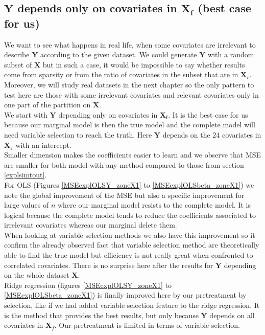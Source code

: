 \documentclass[12pt,a4paper]{report}
\begin{document}
\clearpage
\newpage
\subsection{$\boldsymbol{Y}$ depends only on covariates in $\boldsymbol{X_{f}}$ (best case for us)}	 \label{tableMSEsimdroite}
\FloatBarrier
 We want to see what happens in real life, when some covariates are irrelevant to describe $\boldsymbol{Y}$ according to the given dataset. We could generate $\boldsymbol{Y}$ with a random subset of $\boldsymbol{X}$ but in such a case, it would be impossible to say whether results come from sparsity or from the ratio of covariates in the subset that are in $\boldsymbol{X}_{r}$. Moreover, we will study real datasets in the next chapter so the only pattern to test here are those with some irrelevant covariates and relevant covariates only in one part of the partition on $\boldsymbol{X}$. \\
 	We start with $\boldsymbol{Y}$ depending only on covariates in $\boldsymbol{X_{f}}$. It is the best case for us because our marginal model is then the true model and the complete model will need variable selection to reach the truth. Here $\boldsymbol{Y}$ depends on the 24 covariates in $\boldsymbol{X}_{f}$ with an intercept.\\
 	Smaller dimension makes the coefficients easier to learn and we observe that MSE are smaller for both model with any method compared to those from section \ref{explsimtout}.\\
 	For OLS (Figures \ref{MSEexplOLSY_zoneX1} to \ref{MSEexplOLSbeta_zoneX1}) we note the global improvement of the MSE but also a specific improvement for large values of $n$ where our marginal model resists to the complete model. It is logical because the complete model tends to reduce the coefficients associated to irrelevant covariates whereas our marginal delete them. \\
 	
 	When looking at variable selection methods we also have this improvement so it confirm the already observed fact that variable selection method are theoretically able to find the true model but efficiency is not really great when confronted to correlated covariates. There is no surprise here after the results for $\boldsymbol{Y}$ depending on the whole dataset $\boldsymbol{X}$. \\
 	
 	Ridge regression (figures \ref{MSEexplOLSY_zoneX1} to \ref{MSEexplOLSbeta_zoneX1}) is finally  improved here by our pretreatment by selection, like if we had added variable selection feature to the ridge regression. It is the method that provides the best results, but only because $\boldsymbol{Y}$ depends on all covariates in $\boldsymbol{X}_{f}$. Our pretreatment is limited in terms of variable selection.
 	
\end{document}
